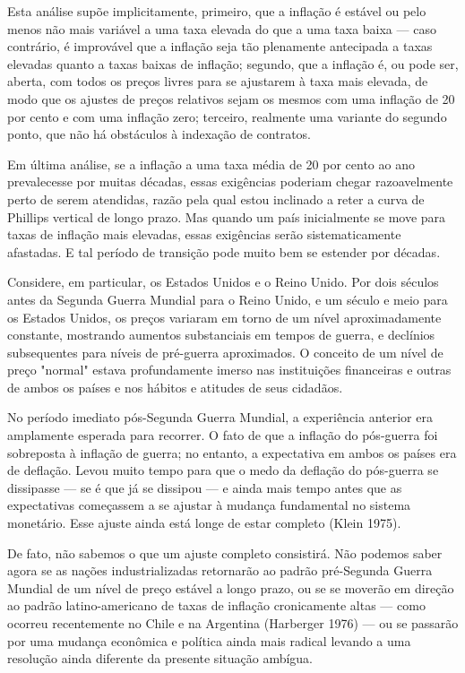 \documentclass[12pt]{article}
\begin{document}
Esta análise supõe implicitamente, primeiro, que a inflação é estável ou pelo menos não mais variável a uma taxa elevada do que a uma taxa baixa — caso contrário, é improvável que a inflação seja tão plenamente antecipada a taxas elevadas quanto a taxas baixas de inflação; segundo, que a inflação é, ou pode ser, aberta, com todos os preços livres para se ajustarem à taxa mais elevada, de modo que os ajustes de preços relativos sejam os mesmos com uma inflação de 20 por cento e com uma inflação zero; terceiro, realmente uma variante do segundo ponto, que não há obstáculos à indexação de contratos.

Em última análise, se a inflação a uma taxa média de 20 por cento ao ano prevalecesse por muitas décadas, essas exigências poderiam chegar razoavelmente perto de serem atendidas, razão pela qual estou inclinado a reter a curva de Phillips vertical de longo prazo. Mas quando um país inicialmente se move para taxas de inflação mais elevadas, essas exigências serão sistematicamente afastadas. E tal período de transição pode muito bem se estender por décadas.

Considere, em particular, os Estados Unidos e o Reino Unido. Por dois séculos antes da Segunda Guerra Mundial para o Reino Unido, e um século e meio para os Estados Unidos, os preços variaram em torno de um nível aproximadamente constante, mostrando aumentos substanciais em tempos de guerra, e declínios subsequentes para níveis de pré-guerra aproximados. O conceito de um nível de preço "normal" estava profundamente imerso nas instituições financeiras e outras de ambos os países e nos hábitos e atitudes de seus cidadãos.

No período imediato pós-Segunda Guerra Mundial, a experiência anterior era amplamente esperada para recorrer. O fato de que a inflação do pós-guerra foi sobreposta à inflação de guerra; no entanto, a expectativa em ambos os países era de deflação. Levou muito tempo para que o medo da deflação do pós-guerra se dissipasse — se é que já se dissipou — e ainda mais tempo antes que as expectativas começassem a se ajustar à mudança fundamental no sistema monetário. Esse ajuste ainda está longe de estar completo (Klein 1975).

De fato, não sabemos o que um ajuste completo consistirá. Não podemos saber agora se as nações industrializadas retornarão ao padrão pré-Segunda Guerra Mundial de um nível de preço estável a longo prazo, ou se se moverão em direção ao padrão latino-americano de taxas de inflação cronicamente altas — como ocorreu recentemente no Chile e na Argentina (Harberger 1976) — ou se passarão por uma mudança econômica e política ainda mais radical levando a uma resolução ainda diferente da presente situação ambígua.
\end{document}
